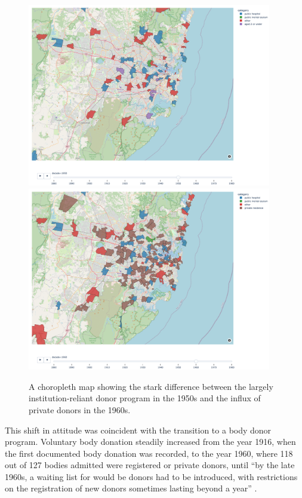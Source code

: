 \begin{figure}[p]
    \centering
    \caption{A choropleth map showing the stark difference between the largely institution-reliant donor program in the 1950s and the influx of private donors in the 1960s.}
    \includegraphics[width=0.95\textwidth]{REPORT/img/choropleth-1950.png}
    \includegraphics[width=0.95\textwidth]{REPORT/img/choropleth-1960.png}
    \label{fig:choropleth-comparison}
\end{figure}

This shift in attitude was coincident with the transition to a body donor program. Voluntary body donation steadily increased from the year 1916, when the first documented body donation was recorded, to the year 1960, where 118 out of 127 bodies admitted were registered or private donors, until ``by the late 1960s, a waiting list for would be donors had to be introduced, with restrictions on the registration of new donors sometimes lasting beyond a year'' \parencite{rebekah_jenkin}.

